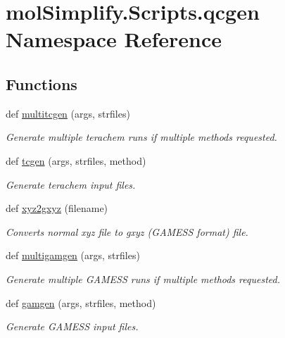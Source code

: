 \hypertarget{namespacemolSimplify_1_1Scripts_1_1qcgen}{}\section{mol\+Simplify.\+Scripts.\+qcgen Namespace Reference}
\label{namespacemolSimplify_1_1Scripts_1_1qcgen}
\subsection*{Functions}
\begin{DoxyCompactItemize}
\item 
def \hyperlink{namespacemolSimplify_1_1Scripts_1_1qcgen_a94d2464e1bb9c7d8af5d714a947d6994}{multitcgen} (args, strfiles)
\begin{DoxyCompactList}\small\item\em Generate multiple terachem runs if multiple methods requested. \end{DoxyCompactList}\item 
def \hyperlink{namespacemolSimplify_1_1Scripts_1_1qcgen_aa7bd72c4230e61a3db1f2162a04c3e77}{tcgen} (args, strfiles, method)
\begin{DoxyCompactList}\small\item\em Generate terachem input files. \end{DoxyCompactList}\item 
def \hyperlink{namespacemolSimplify_1_1Scripts_1_1qcgen_a67aee71c611a98c744c92e8670b6ebeb}{xyz2gxyz} (filename)
\begin{DoxyCompactList}\small\item\em Converts normal xyz file to gxyz (G\+A\+M\+E\+SS format) file. \end{DoxyCompactList}\item 
def \hyperlink{namespacemolSimplify_1_1Scripts_1_1qcgen_ac9ba55dfec85cff6e4ecabe2a4733e4d}{multigamgen} (args, strfiles)
\begin{DoxyCompactList}\small\item\em Generate multiple G\+A\+M\+E\+SS runs if multiple methods requested. \end{DoxyCompactList}\item 
def \hyperlink{namespacemolSimplify_1_1Scripts_1_1qcgen_a9669d94c4c797a40526361b957e663ff}{gamgen} (args, strfiles, method)
\begin{DoxyCompactList}\small\item\em Generate G\+A\+M\+E\+SS input files. \end{DoxyCompactList}\item 

\end{DoxyCompactItemize}
